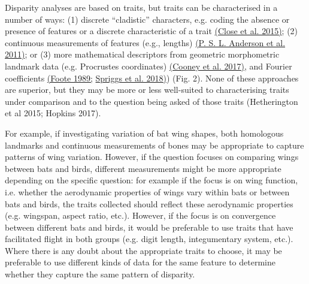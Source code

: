 Disparity analyses are based on traits, but traits can be characterised
in a number of ways: (1) discrete ``cladistic'' characters, e.g. coding
the absence or presence of features or a discrete characteristic of a
trait \href{https://paperpile.com/c/sTGYvp/PbSx}{(Close et al. 2015)};
(2) continuous measurements of features (e.g., lengths)
\href{https://paperpile.com/c/sTGYvp/qjj9}{(P. S. L. Anderson et al.
2011)}; or (3) more mathematical descriptors from geometric morphometric
landmark data (e.g. Procrustes coordinates)
\href{https://paperpile.com/c/sTGYvp/RjqE}{(Cooney et al. 2017)}, and
Fourier coefficients \href{https://paperpile.com/c/sTGYvp/2Neu}{(Foote
1989;} \href{https://paperpile.com/c/sTGYvp/ZEDR}{Spriggs et al. 2018)})
(Fig. 2). None of these approaches are superior, but they may be more or
less well-suited to characterising traits under comparison and to the
question being asked of those traits (Hetherington et al 2015; Hopkins
2017).

For example, if investigating variation of bat wing shapes, both
homologous landmarks and continuous measurements of bones may be
appropriate to capture patterns of wing variation. However, if the
question focuses on comparing wings between bats and birds, different
measurements might be more appropriate depending on the specific
question: for example if the focus is on wing function, i.e. whether the
aerodynamic properties of wings vary within bats or between bats and
birds, the traits collected should reflect these aerodynamic properties
(e.g. wingspan, aspect ratio, etc.). However, if the focus is on
convergence between different bats and birds, it would be preferable to
use traits that have facilitated flight in both groups (e.g. digit
length, integumentary system, etc.). Where there is any doubt about the
appropriate traits to choose, it may be preferable to use different
kinds of data for the same feature to determine whether they capture the
same pattern of disparity.

